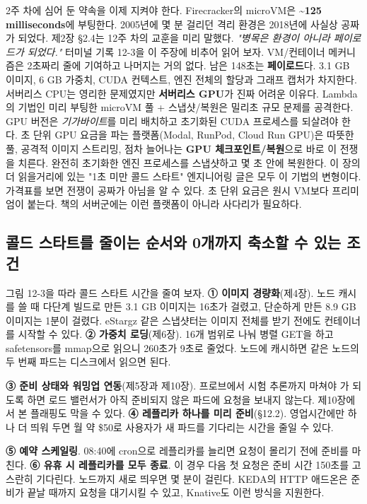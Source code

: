2주 차에 심어 둔 약속을 이제 지켜야 한다. Firecracker의 microVM은 \textbf{\textasciitilde{}125 milliseconds}에 부팅한다. 2005년에 몇 분 걸리던 격리 환경은 2018년에 사실상 공짜가 되었다. 제2장 §2.4는 12주 차의 교훈을 미리 말했다. \textit{"병목은 환경이 아니라 페이로드가 되었다."} 터미널 기록 12-3을 이 주장에 비추어 읽어 보자. VM/컨테이너 메커니즘은 2초짜리  줄에 기여하고 나머지는 거의 없다. 남은 148초는 \textbf{페이로드}다. 3.1 GB 이미지, 6 GB 가중치, CUDA 컨텍스트, 엔진 전체의 할당과 그래프 캡처가 차지한다. 서버리스 CPU는 영리한 문제였지만 \textbf{서버리스 GPU}가 진짜 어려운 이유다. Lambda의 기법인 미리 부팅한 microVM 풀 + 스냅샷/복원은 밀리초 규모 문제를 공격한다. GPU 버전은 \textit{기가바이트}를 미리 배치하고 초기화된 CUDA 프로세스를 되살려야 한다. 초 단위 GPU 요금을 파는 플랫폼(Modal, RunPod, Cloud Run GPU)은 따뜻한 풀, 공격적 이미지 스트리밍, 점차 늘어나는 \textbf{GPU 체크포인트/복원}으로 바로 이 전쟁을 치른다. 완전히 초기화한 엔진 프로세스를 스냅샷하고 몇 초 안에 복원한다. 이 장의 더 읽을거리에 있는 "1초 미만 콜드 스타트" 엔지니어링 글은 모두 이 기법의 변형이다. 가격표를 보면 전쟁이 공짜가 아님을 알 수 있다. 초 단위 요금은 원시 VM보다 프리미엄이 붙는다. 책의 서버군에는 이런 플랫폼이 아니라 사다리가 필요하다.

\subsection*{콜드 스타트를 줄이는 순서와 0개까지 축소할 수 있는 조건}

그림 12-3을 따라 콜드 스타트 시간을 줄여 보자. \textbf{① 이미지 경량화}(제4장). 노드 캐시를 쓸 때 다단계 빌드로 만든 3.1 GB 이미지는 16초가 걸렸고, 단순하게 만든 8.9 GB 이미지는 1분이 걸렸다. eStargz 같은 스냅샷터는 이미지 전체를 받기 전에도 컨테이너를 시작할 수 있다. \textbf{② 가중치 로딩}(제6장). 16개 범위로 나눠 병렬 GET을 하고 safetensors를 mmap으로 읽으니 260초가 9초로 줄었다. 노드에 캐시하면 같은 노드의 두 번째 파드는 디스크에서 읽으면 된다.

\textbf{③ 준비 상태와 워밍업 연동}(제5장과 제10장). 프로브에서 시험 추론까지 마쳐야 가 되도록 하면 로드 밸런서가 아직 준비되지 않은 파드에 요청을 보내지 않는다. 제10장에서 본 플래핑도 막을 수 있다. \textbf{④ 레플리카 하나를 미리 준비}(§12.2). 영업시간에만 하나 더 띄워 두면 월 약 \$50로 사용자가 새 파드를 기다리는 시간을 줄일 수 있다.

\textbf{⑤ 예약 스케일링}. 08:40에 cron으로 레플리카를 늘리면 요청이 몰리기 전에 준비를 마친다. \textbf{⑥ 유휴 시 레플리카를 모두 종료}. 이 경우 다음 첫 요청은 준비 시간 150초를 고스란히 기다린다. 노드까지 새로 띄우면 몇 분이 걸린다. KEDA의 HTTP 애드온은 준비가 끝날 때까지 요청을 대기시킬 수 있고, Knative도 이런 방식을 지원한다.

